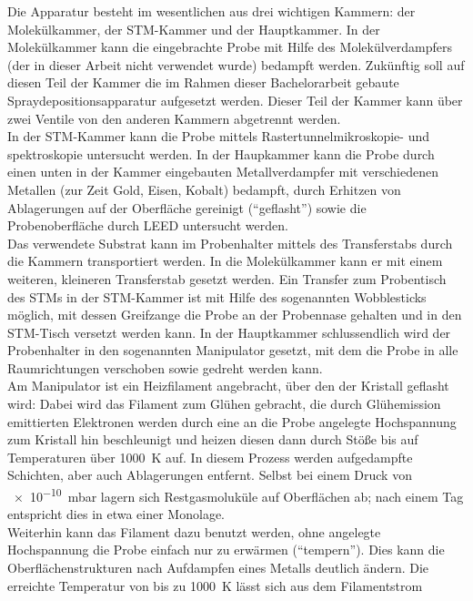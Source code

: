 Die Apparatur besteht im wesentlichen aus drei wichtigen Kammern: 
der 
Molekülkammer, der STM-Kammer und der Hauptkammer. In der Molekülkammer kann die eingebrachte
Probe mit Hilfe des Molekülverdampfers (der in dieser Arbeit nicht verwendet wurde) bedampft werden.
Zukünftig soll auf diesen Teil der Kammer die im Rahmen dieser Bachelorarbeit gebaute
Spraydepositionsapparatur aufgesetzt werden. Dieser Teil der Kammer kann über zwei Ventile von den
anderen Kammern abgetrennt werden.
\\
In der STM-Kammer kann die Probe
mittels Rastertunnelmikroskopie- und spektroskopie untersucht werden. In der Haupkammer kann die
Probe durch einen unten in der Kammer eingebauten Metallverdampfer mit
verschiedenen Metallen (zur Zeit Gold, Eisen, Kobalt) bedampft, durch Erhitzen von Ablagerungen auf
der Oberfläche gereinigt ("`geflasht"') sowie die Probenoberfläche durch LEED untersucht werden. 
\\
Das verwendete Substrat kann im Probenhalter mittels des
Transferstabs durch die Kammern transportiert werden. In die Molekülkammer kann er mit einem
weiteren, kleineren Transferstab gesetzt werden. Ein Transfer zum Probentisch des STMs in der
STM-Kammer ist mit Hilfe des sogenannten Wobblesticks möglich, mit dessen Greifzange die Probe an der Probennase gehalten und in
den STM-Tisch versetzt werden kann. In der Hauptkammer schlussendlich wird der Probenhalter in den
sogenannten Manipulator gesetzt, mit dem die Probe in alle Raumrichtungen verschoben sowie gedreht
werden kann. 
\\
Am Manipulator ist ein Heizfilament angebracht, über den der Kristall geflasht wird:
Dabei wird das Filament zum Glühen gebracht, die durch Glühemission emittierten Elektronen werden
durch eine an die Probe angelegte Hochspannung zum Kristall hin beschleunigt und heizen diesen dann
durch Stöße bis auf Temperaturen über \SI{1000}{K} auf. In diesem Prozess werden aufgedampfte
Schichten, aber auch Ablagerungen entfernt. Selbst bei einem Druck von \SI{e-10}{mbar} lagern sich
Restgasmoluküle auf Oberflächen ab; nach einem Tag entspricht dies in etwa einer Monolage.
\\
Weiterhin kann das Filament dazu benutzt werden, ohne angelegte Hochspannung die Probe einfach nur
zu erwärmen ("`tempern"'). Dies kann die Oberflächenstrukturen nach Aufdampfen eines Metalls
deutlich ändern. Die erreichte Temperatur von bis zu \SI{1000}{K} lässt sich aus dem Filamentstrom
